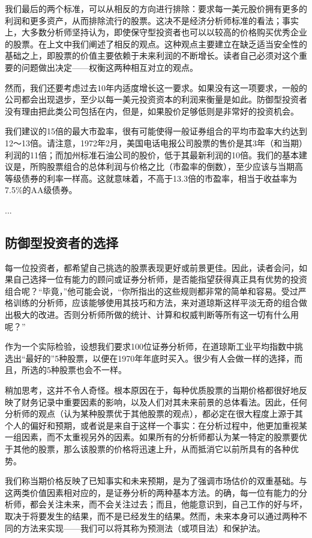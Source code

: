 \documentclass[12pt,oneside]{book}
\begin{document}
我们最后的两个标准，可以从相反的方向进行排除：要求每一美元股价拥有更多的利润和更多资产，从而排除流行的股票。这决不是经济分析师标准的看法；事实上，大多数分析师坚持认为，即使保守型投资者也可以以较高的价格购买优秀企业的股票。在上文中我们阐述了相反的观点。这种观点主要建立在缺乏适当安全性的基础之上，即股票的价值主要依赖于未来利润的不断增长。读者自己必须对这个重要的问题做出决定——权衡这两种相互对立的观点。

然而，我们还要考虑过去10年内适度增长这一要求。如果没有这一项要求，一般的公司都会出现退步，至少以每一美元投资资本的利润来衡量是如此。防御型投资者没有理由把此类公司包括在内，但是，如果股价足够低则是非常好的投资机会。

我们建议的15倍的最大市盈率，很有可能使得一般证券组合的平均市盈率大约达到12～13倍。请注意，1972年2月，美国电话电报公司股票的售价是其3年（和当期）利润的11倍；而加州标准石油公司的股价，低于其最新利润的10倍。我们的基本建议是，所购股票组合的总体利润与价格之比（市盈率的倒数），至少应该与当期高等级债券的利率一样高。这就意味着，不高于13.3倍的市盈率，相当于收益率为7.5\%的AA级债券。

...





\subsection{防御型投资者的选择}
每一位投资者，都希望自己挑选的股票表现更好或前景更佳。因此，读者会问，如果自己选择一位有能力的顾问或证券分析师，是否能指望获得真正具有优势的投资组合呢？“毕竟，”他可能会说，“你所指出的这些规则都非常的简单和容易。受过严格训练的分析师，应该能够使用其技巧和方法，来对道琼斯这样平淡无奇的组合做出极大的改进。否则分析师所做的统计、计算和权威判断等所有这一切有什么用呢？”

作为一个实际检验，设想我们要求100位证券分析师，在道琼斯工业平均指数中挑选出“最好的”5种股票，以便在1970年年底时买入。很少有人会做一样的选择，而且，所选的5种股票也会不一样。

稍加思考，这并不令人奇怪。根本原因在于，每种优质股票的当期价格都很好地反映了财务记录中重要因素的影响，以及人们对其未来前景的总体看法。因此，任何分析师的观点（认为某种股票优于其他股票的观点），都必定在很大程度上源于其个人的偏好和预期，或者说是来自于这样一个事实：在分析过程中，他更加重视某一组因素，而不太重视另外的因素。如果所有的分析师都认为某一特定的股票要优于其他的股票，那么该股票的价格将迅速上升，从而抵消它以前所具有的各种优势。

我们称当期价格反映了已知事实和未来预期，是为了强调市场估价的双重基础。与这两类价值因素相对应的，是证券分析的两种基本方法。的确，每一位有能力的分析师，都会关注未来，而不会关注过去；而且，他能意识到，自己工作的好与坏，取决于将要发生的结果，而不是已经发生的结果。然而，未来本身可以通过两种不同的方法来实现——我们可以将其称为预测法（或项目法）和保护法。
\end{document}
